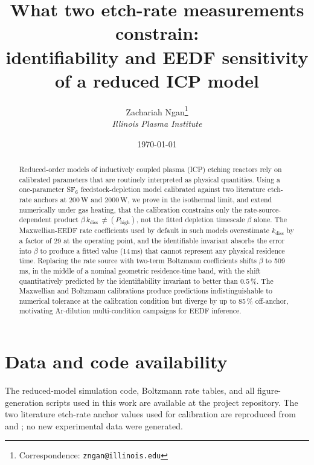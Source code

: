 \documentclass[11pt,a4paper]{article}
\title{What two etch-rate measurements constrain:\\
       identifiability and EEDF sensitivity of a reduced \sfsix{}
       ICP model}
\author{Zachariah Ngan\thanks{%
  Correspondence: \texttt{zngan@illinois.edu}}\\[2pt]
  \normalsize\itshape Illinois Plasma Institute}
\date{\today}
\newcommand{\sfsix}{SF$_6$}
\newcommand{\kdiss}{k_{\mathrm{diss}}}
\begin{document}
\maketitle

\begin{abstract}
Reduced-order models of inductively coupled plasma (ICP) etching
reactors rely on calibrated parameters that are routinely interpreted
as physical quantities. Using a one-parameter \sfsix{}
feedstock-depletion model calibrated against two literature etch-rate
anchors at 200\,W and 2000\,W, we prove in the isothermal limit, and
extend numerically under gas heating, that the calibration constrains
only the rate-source-dependent product
$\beta\,\kdiss\,\ne(P_{\mathrm{high}})$, not the fitted depletion
timescale $\beta$ alone. The Maxwellian-EEDF rate coefficients used
by default in such models overestimate $\kdiss$ by a factor of 29 at
the operating point, and the identifiable invariant absorbs the
error into $\beta$ to produce a fitted value (14\,ms) that cannot
represent any physical residence time. Replacing the rate source
with two-term Boltzmann coefficients shifts $\beta$ to 509\,ms, in
the middle of a nominal geometric residence-time band, with the
shift quantitatively predicted by the identifiability invariant to
better than 0.5\,\%. The Maxwellian and Boltzmann calibrations
produce predictions indistinguishable to numerical tolerance at the
calibration condition but diverge by up to 85\,\% off-anchor,
motivating Ar-dilution multi-condition campaigns for EEDF inference.
\end{abstract}









\section*{Data and code availability}
The reduced-model simulation code, Boltzmann rate tables, and all
figure-generation scripts used in this work are available at the
project repository. The two literature etch-rate anchor values used
for calibration are reproduced from \citet{mansano1999} and
\citet{panduranga2019}; no new experimental data were generated.



\end{document}
